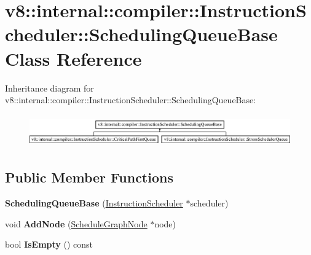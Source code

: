 \hypertarget{classv8_1_1internal_1_1compiler_1_1_instruction_scheduler_1_1_scheduling_queue_base}{}\section{v8\+:\+:internal\+:\+:compiler\+:\+:Instruction\+Scheduler\+:\+:Scheduling\+Queue\+Base Class Reference}
\label{classv8_1_1internal_1_1compiler_1_1_instruction_scheduler_1_1_scheduling_queue_base}
Inheritance diagram for v8\+:\+:internal\+:\+:compiler\+:\+:Instruction\+Scheduler\+:\+:Scheduling\+Queue\+Base\+:\begin{figure}[H]
\begin{center}
\leavevmode
\includegraphics[height=1.417722cm]{classv8_1_1internal_1_1compiler_1_1_instruction_scheduler_1_1_scheduling_queue_base}
\end{center}
\end{figure}
\subsection*{Public Member Functions}
\begin{DoxyCompactItemize}
\item 
{\bfseries Scheduling\+Queue\+Base} (\hyperlink{classv8_1_1internal_1_1compiler_1_1_instruction_scheduler}{Instruction\+Scheduler} $\ast$scheduler)\hypertarget{classv8_1_1internal_1_1compiler_1_1_instruction_scheduler_1_1_scheduling_queue_base_ac75d976eaffaab1e125673aa57216ef3}{}\label{classv8_1_1internal_1_1compiler_1_1_instruction_scheduler_1_1_scheduling_queue_base_ac75d976eaffaab1e125673aa57216ef3}

\item 
void {\bfseries Add\+Node} (\hyperlink{classv8_1_1internal_1_1compiler_1_1_instruction_scheduler_1_1_schedule_graph_node}{Schedule\+Graph\+Node} $\ast$node)\hypertarget{classv8_1_1internal_1_1compiler_1_1_instruction_scheduler_1_1_scheduling_queue_base_a46f3f4ad26a08fb4e8e1f1d066e979d9}{}\label{classv8_1_1internal_1_1compiler_1_1_instruction_scheduler_1_1_scheduling_queue_base_a46f3f4ad26a08fb4e8e1f1d066e979d9}

\item 
bool {\bfseries Is\+Empty} () const \hypertarget{classv8_1_1internal_1_1compiler_1_1_instruction_scheduler_1_1_scheduling_queue_base_a525daea3b083b52fe9b4696187564e6c}{}\label{classv8_1_1internal_1_1compiler_1_1_instruction_scheduler_1_1_scheduling_queue_base_a525daea3b083b52fe9b4696187564e6c}

\end{DoxyCompactItemize}
